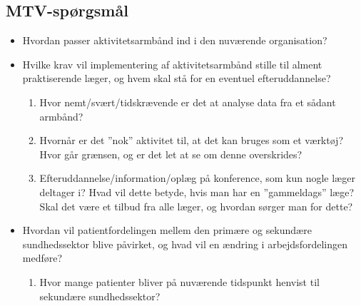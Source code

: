 \subsection{MTV-spørgsmål}
\begin{itemize}
\item Hvordan passer aktivitetsarmbånd ind i den nuværende organisation? 
\item Hvilke krav vil implementering af aktivitetsarmbånd stille til alment praktiserende læger, og hvem skal stå for en eventuel efteruddannelse? 
\begin{enumerate}
\item Hvor nemt/svært/tidskrævende er det at analyse data fra et sådant armbånd?
\item Hvornår er det ”nok” aktivitet til, at det kan bruges som et værktøj? Hvor går grænsen, og er det let at se om denne overskrides? 
\item Efteruddannelse/information/oplæg på konference, som kun nogle læger deltager i? Hvad vil dette betyde, hvis man har en ”gammeldags” læge?  Skal det være et tilbud fra alle læger, og hvordan sørger man for dette?
\end{enumerate}
\item  Hvordan vil patientfordelingen mellem den primære og sekundære sundhedssektor blive påvirket, og hvad vil en ændring i arbejdsfordelingen medføre?
\begin{enumerate}
\item Hvor mange patienter bliver på nuværende tidspunkt henvist til sekundære sundhedssektor?
\end{enumerate} 
\end{itemize}